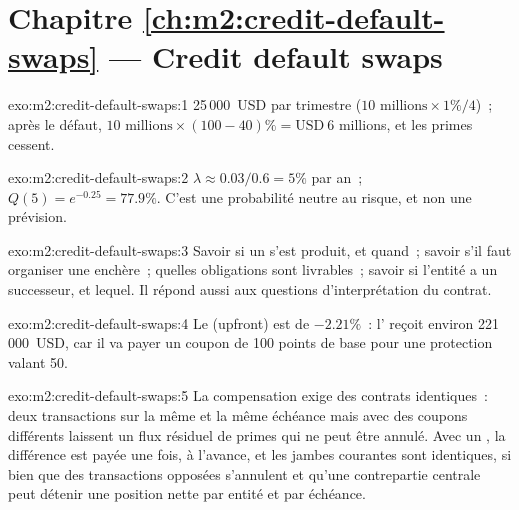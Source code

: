 \section*{Chapitre \ref{ch:m2:credit-default-swaps} --- Credit default swaps}

\begin{solution}{exo:m2:credit-default-swaps:1}
25\,000~USD par trimestre ($10 \text{ millions} \times 1\% / 4$)~; après le défaut, $10
\text{ millions} \times (100 - 40)\% = \text{USD}~6$ millions, et les primes cessent.
\end{solution}

\begin{solution}{exo:m2:credit-default-swaps:2}
$\lambda \approx 0.03 / 0.6 = 5\%$ par an~; $Q(5) = e^{-0.25} = 77.9\%$. C'est une
probabilité neutre au risque, et non une prévision.
\end{solution}

\begin{solution}{exo:m2:credit-default-swaps:3}
Savoir si un  s'est produit, et quand~; savoir s'il faut organiser une enchère~; quelles
obligations sont livrables~; savoir si l'entité a un successeur, et lequel. Il répond aussi
aux questions d'interprétation du contrat.
\end{solution}

\begin{solution}{exo:m2:credit-default-swaps:4}
Le  (upfront) est de $-2.21\%$~: l' reçoit environ 221\,000~USD, car il
va payer un coupon de 100 points de base pour une protection valant 50.
\end{solution}

\begin{solution}{exo:m2:credit-default-swaps:5}
La compensation exige des contrats identiques~: deux transactions sur la même  et la même échéance mais avec
des coupons différents laissent un flux résiduel de primes qui ne peut être annulé. Avec un
, la différence est payée une fois, à l'avance, et les jambes courantes
sont identiques, si bien que des transactions opposées s'annulent et qu'une contrepartie centrale
peut détenir une position nette par entité et par échéance.
\end{solution}

